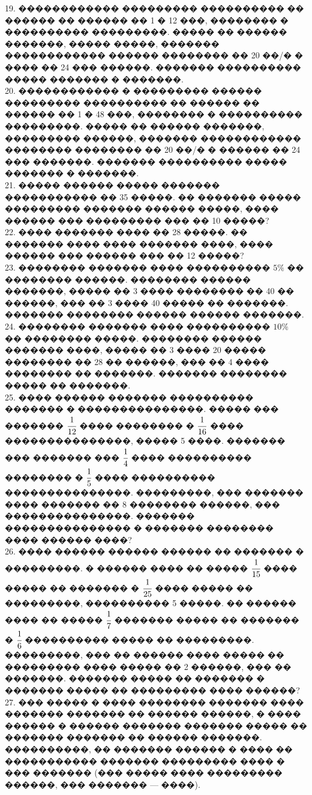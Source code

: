 \documentclass[12pt]{article}
\begin{document}
19. ������������ ��������� ���������� �� ������ �� ������ �� 1 � 12 ���, �������� � ���������� ���������. ����� �� ������ �������, ����� �����, ������� ������������ ������ �������� �� 20 ��/� � ���� �� 24 ��� ������. ������� ���������� ����� ������� � �������.\\
20. ������������ � ��������� ������ ��������� ���������� �� ������ �� ������ �� 1 � 48 ���, �������� � ���������� ���������. ����� �� ������ �������, ��������� ������, ������� ������������ �������� �������� �� 20 ��/� � ������ �� 24 ��� �������. ������� ���������� ����� ������� � �������.\\
21. ����� ������ ����� ������� ����������� �� 35 �����. �� ������� ����� ��������� ������� ������ �����, ���� ������ ��� ��������� ��� �� 10 �����?\\
22. ���� ������� ���� �� 28 �����. �� ������� ���� ���� ������� ����, ���� ������ ��� ������ ��� �� 12 �����?\\
23. �������� ������� ���� ���������� $5\%$ �� �������� ������. �������� ������ �������, ����� �� 3 ���� �������� �� 40 �� ������, ��� �� 3 ���� 40 ����� �� �������. ������� �������� ������ ������ �������.\\
24. �������� ������� ���� ���������� $10\%$ �� �������� �����. �������� ������ ������� ����, ����� �� 3 ���� 20 ����� �������� �� 28 �� ������, ��� �� 4 ���� �������� �� �������. ������� �������� ����� �� �������.\\
25. ���� ������ ������� ���������� ������� � ���������������. ����� ��� ������� $\cfrac{1}{12}$ ���� �������� � $\cfrac{1}{16}$ ���� ���������������, ����� 5 ����. ������� ��� ������� ��� $\cfrac{1}{4}$ ���� ���������� �������� � $\cfrac{1}{5}$ ���� ���������� ���������������. ���������, ��� ������� ���� ������� �� 8 �������� ������, ��� ���������������. ������� ��������������� � ������� �������� ���� ������ ����?\\
26. ���� ������ ������ ������ �� ������� � ���������. � ������ ���� �� ����� $\cfrac{1}{15}$ ���� ����� �� ������� � $\cfrac{1}{25}$ ���� ����� �� ���������, ���������� 5 �����. �� ������ ���� �� ����� $\cfrac{1}{7}$ ������� ����� �� ������� � $\cfrac{1}{6}$ ���������� ����� �� ���������. ���������, ��� �� ������ ���� ����� �� ��������� ���� ����� �� 2 ������, ��� �� �������. ������� ����� �� ������� � ������� ����� �� ��������� ���� ������?\\
27. ��� ����� � ���� �������� ������� ���� ������� ������� �� ������ ������, � ���� ������ � ������ ������� ������� ����� �� ������� ������� �� ������ �������. ����������, �� ������� ������ � ���� �� ����������� ������� ��������� ���� � ��� ������� (��� ����� ���� ��������� ������, ��� ������� --- ����).\\
\end{document}
